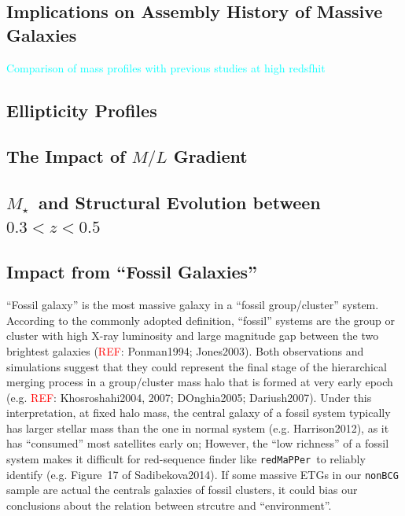 \documentclass[preprint]{aastex}
\def\redm{\texttt{redMaPPer}}
\def\mstar{{$M_{\star}$}~}
\newcommand{\plan}[1]{\textcolor{cyan}{#1}}
\newcommand{\addref}{{\textcolor{red}{REF}}}
\begin{document}
\begin{CJK*}{UTF8}{gbsn}
\subsection{Implications on Assembly History of Massive Galaxies}

    \plan{Comparison of mass profiles with previous studies at high redsfhit}

\subsection{Ellipticity Profiles}

\subsection{The Impact of $M/L$ Gradient}

\subsection{\mstar and Structural Evolution between $0.3 < z < 0.5$}

    

\subsection{Impact from ``Fossil Galaxies''}

    ``Fossil galaxy'' is the most massive galaxy in a ``fossil group/cluster''
    system.
    According to the commonly adopted definition, ``fossil'' systems are the 
    group or cluster with high X-ray luminosity and large magnitude gap between 
    the two brightest galaxies (\addref: Ponman1994; Jones2003). 
    Both observations and simulations suggest that they could represent the 
    final stage of the hierarchical merging process in a group/cluster mass
    halo that is formed at very early epoch (e.g. \addref: 
    Khosroshahi2004, 2007; DOnghia2005; Dariush2007).
    Under this interpretation, at fixed halo mass, the central galaxy of 
    a fossil system typically has larger stellar mass than the one in normal 
    system (e.g. Harrison2012), as it has ``consumed'' most satellites 
    early on; 
    However, the ``low richness'' of a fossil system makes it difficult for 
    red-sequence finder like \redm~to reliably identify 
    (e.g. Figure~17 of Sadibekova2014).  
    If some massive ETGs in our \texttt{nonBCG} sample are actual the centrals 
    galaxies of fossil clusters, it could bias our conclusions about the 
    relation between strcutre and ``environment''.  
    

\end{CJK*}
\end{document}
